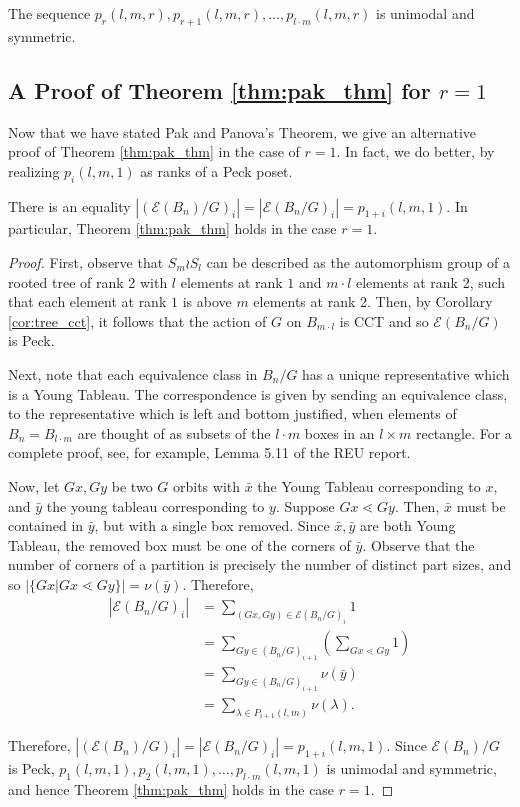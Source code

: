 \documentclass[smallextended, envcountsame, numbook]{svjour3}
\numberwithin{equation}{section}
\newcommand\ssec{\subsection}
\begin{document}
\begin{theorem}
\label{thm:pak_thm}
\cite[Theorem 1.1]{pak}
The sequence $p_r(l,m,r), p_{r+1}(l,m,r),\ldots, p_{l\cdot m}(l,m,r)$ is unimodal and symmetric.
\end{theorem}

\ssec{A Proof of Theorem \ref{thm:pak_thm} for $r = 1$}
Now that we have stated Pak and Panova's Theorem, we give an alternative proof of Theorem \ref{thm:pak_thm} in the case of $r=1$. In fact, we do better, by realizing $p_i(l,m,1)$ as ranks of a Peck poset.

\begin{proposition}
\label{prop:rank_gen_fn_wreath_1}
There is an equality $|(\mathcal E(B_n)/G)_i| = |\mathcal E(B_n/G)_i| = p_{1+i}(l,m,1)$. In particular, Theorem \ref{thm:pak_thm} holds in the case $r = 1$.
\end{proposition}
\begin{proof}

First, observe that $S_m \wr S_l$ can be described as the automorphism group of a rooted tree of rank 2 with $l$ elements at rank $1$ and $m\cdot l$ elements at rank 2, such that each element at rank $1$ is above $m$ elements at rank 2. Then, by Corollary \ref{cor:tree_cct}, it follows that the action of $G$ on $B_{m \cdot l}$ is CCT and so $\mathcal E(B_n/G)$ is Peck.

Next, note that each equivalence class in $B_n/G$ has a unique representative which is a Young Tableau. The correspondence is given by sending an equivalence class, to the representative which is left and bottom justified, when elements of $B_n = B_{l \cdot m}$ are thought of as subsets of the $l \cdot m$ boxes in an $l \times m$ rectangle. For a complete proof, see, for example, Lemma 5.11 of the REU report.

Now, let $Gx,Gy$ be two $G$ orbits with $\bar x$ the Young Tableau corresponding to $x$, and $\bar y$ the young tableau corresponding to $y$. Suppose $Gx \lessdot Gy$. Then, $\bar x$ must be contained in $\bar y$, but with a single box removed. Since $\bar x,\bar y$ are both Young Tableau, the removed box must be one of the corners of $\bar y$. Observe that the number of corners of a partition is precisely the number of distinct part sizes, and so $|\{Gx|Gx \lessdot Gy\}| = \nu(\bar y)$. Therefore,
\begin{align*}
  |\mathcal E(B_n/G)_i| &= \sum_{(Gx,Gy) \in \mathcal E(B_n/G)_i} 1 
  \\
  &= \sum_{Gy \in (B_n/G)_{i+1}} \left(\sum_{Gx \lessdot Gy}^{} 1 \right) 
  \\
  &= \sum_{Gy \in (B_n/G)_{i+1}}\nu(\bar y) 
  \\
  &=  \sum_{\lambda \in P_{i+1}(l,m)} \nu(\lambda).
\end{align*}

Therefore, $|(\mathcal E(B_n)/G)_i| = |\mathcal E(B_n/G)_i| = p_{1+i}(l,m,1)$. Since $\mathcal E(B_n)/G$ is Peck,
\linebreak
$p_1(l,m,1), p_{2}(l,m,1),\ldots, p_{l\cdot m}(l,m,1)$ is unimodal and symmetric, and hence Theorem \ref{thm:pak_thm} holds in the case $r = 1$.
\end{proof}
\end{document}
